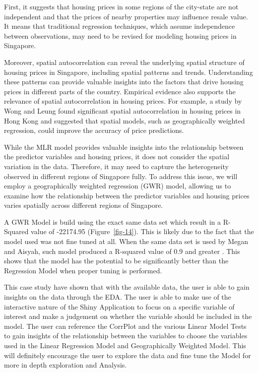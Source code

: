 \documentclass[manuscript,screen]{acmart}
\begin{document}
First, it suggests that housing prices in some regions of the city-state
are not independent and that the prices of nearby properties may
influence resale value. It means that traditional regression techniques,
which assume independence between observations, may need to be revised
for modeling housing prices in Singapore.

Moreover, spatial autocorrelation can reveal the underlying spatial
structure of housing prices in Singapore, including spatial patterns and
trends. Understanding these patterns can provide valuable insights into
the factors that drive housing prices in different parts of the country.
Empirical evidence also supports the relevance of spatial
autocorrelation in housing prices. For example, a study by Wong and
Leung \citep{chunwah2011} found significant spatial autocorrelation in
housing prices in Hong Kong and suggested that spatial models, such as
geographically weighted regression, could improve the accuracy of price
predictions.

While the MLR model provides valuable insights into the relationship
between the predictor variables and housing prices, it does not consider
the spatial variation in the data. Therefore, it may need to capture the
heterogeneity observed in different regions of Singapore fully. To
address this issue, we will employ a geographically weighted regression
(GWR) model, allowing us to examine how the relationship between the
predictor variables and housing prices varies spatially across different
regions of Singapore.

A GWR Model is build using the exact same data set which result in a
R-Squared value of -22174.95 (Figure~\ref{fig-14}). This is likely due
to the fact that the model used was not fine tuned at all. When the same
data set is used by Megan and Aisyah, such model produced a R-squared
value of 0.9 and greater \citep{sim23} \citep{Aisyah}. This shows that
the model has the potential to be significantly better than the
Regression Model when proper tuning is performed.

This case study have shown that with the available data, the user is
able to gain insights on the data through the EDA. The user is able to
make use of the interactive nature of the Shiny Application to focus on
a specific variable of interest and make a judgement on whether the
variable should be included in the model. The user can reference the
CorrPlot and the various Linear Model Tests to gain insights of the
relationship between the variables to choose the variables used in the
Linear Regression Model and Geographically Weighted Model. This will
definitely encourage the user to explore the data and fine tune the
Model for more in depth exploration and Analysis.
\end{document}

